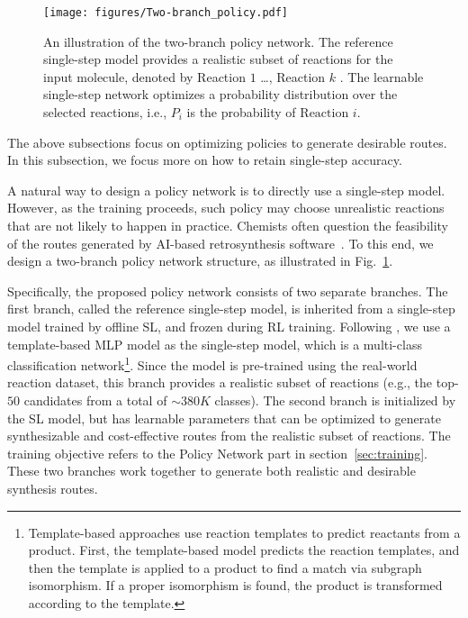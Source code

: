 \documentclass[nohyperref]{article}
\theoremstyle{plain}
\theoremstyle{definition}
\theoremstyle{remark}
\begin{document}
\begin{figure}[t]
\centerline{\texttt{[image: figures/Two-branch\_policy.pdf]}}
\caption{An illustration of the two-branch policy network. The reference single-step model provides a realistic subset of reactions for the input molecule, denoted by Reaction $1$ \dots, Reaction $k$ . 
The learnable single-step network optimizes a probability distribution over the selected reactions, i.e., $P_{i}$ is the probability of $\text{Reaction } i$.}
\label{fig:two-branch}
\end{figure}



The above subsections focus on optimizing policies to generate desirable routes. 
In this subsection, we focus more on how to retain single-step accuracy.

A natural way to design a policy network is to directly use a single-step model. However, as the training proceeds, 
such policy may choose unrealistic reactions that are not likely to happen in practice. 
Chemists often question the feasibility of the routes generated by AI-based retrosynthesis software~\cite{genheden2022paroutes}.
To this end, 
we design a two-branch policy network structure, as illustrated in Fig.~\ref{fig:two-branch}.  







Specifically, the proposed policy network consists of two separate branches. 
The first branch, called the reference single-step model, is inherited from a single-step model trained by offline SL, and frozen during RL training. 
Following \citep{Segler2018PlanningCS, chen20retrostar}, we use a template-based MLP model as the single-step model, which is a multi-class classification network\footnote{Template-based approaches use reaction templates to predict reactants from a product. First, the template-based model predicts the reaction templates, and then the template is applied to a product to find a match via subgraph isomorphism. If a proper isomorphism is found, the product is transformed according to the template.}.
Since the model is pre-trained using the real-world reaction dataset, 
this branch provides a realistic subset of reactions (e.g., the top-$50$ candidates from a total of $\sim 380K$ classes).
The second branch is initialized by the SL model, but has learnable parameters that can be optimized to generate synthesizable and cost-effective routes from the realistic subset of reactions. 
The training objective refers to the Policy Network part in section~\ref{sec:training}.
These two branches work together to generate both realistic and desirable synthesis routes.
\end{document}
